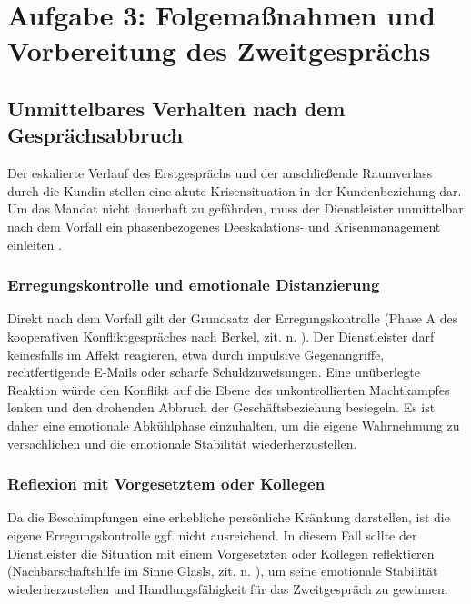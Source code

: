 
\chapter{Aufgabe 3: Folgemaßnahmen und Vorbereitung des Zweitgesprächs} 
\label{sec:aufgabe3}

\section{Unmittelbares Verhalten nach dem Gesprächsabbruch}
Der eskalierte Verlauf des Erstgesprächs und der anschließende Raumverlass durch die Kundin stellen eine akute Krisensituation in der Kundenbeziehung dar. Um das Mandat nicht dauerhaft zu gefährden, muss der Dienstleister unmittelbar nach dem Vorfall ein phasenbezogenes Deeskalations- und Krisenmanagement einleiten \cite[S.~42--44]{5}.

\subsection{Erregungskontrolle und emotionale Distanzierung}
Direkt nach dem Vorfall gilt der Grundsatz der Erregungskontrolle (Phase A des kooperativen Konfliktgespräches nach Berkel, zit. n. \cite[S.~49--50]{5}). Der Dienstleister darf keinesfalls im Affekt reagieren, etwa durch impulsive Gegenangriffe, rechtfertigende E-Mails oder scharfe Schuldzuweisungen. Eine unüberlegte Reaktion würde den Konflikt auf die Ebene des unkontrollierten Machtkampfes lenken und den drohenden Abbruch der Geschäftsbeziehung besiegeln. Es ist daher eine emotionale Abkühlphase einzuhalten, um die eigene Wahrnehmung zu versachlichen und die emotionale Stabilität wiederherzustellen.

\subsection{Reflexion mit Vorgesetztem oder Kollegen}
Da die Beschimpfungen eine erhebliche persönliche Kränkung darstellen, ist die eigene Erregungskontrolle ggf. nicht ausreichend. In diesem Fall sollte der Dienstleister die Situation mit einem Vorgesetzten oder Kollegen reflektieren (Nachbarschaftshilfe im Sinne Glasls, zit. n. \cite[S.~53--54]{5}), um seine emotionale Stabilität wiederherzustellen und Handlungsfähigkeit für das Zweitgespräch zu gewinnen.

